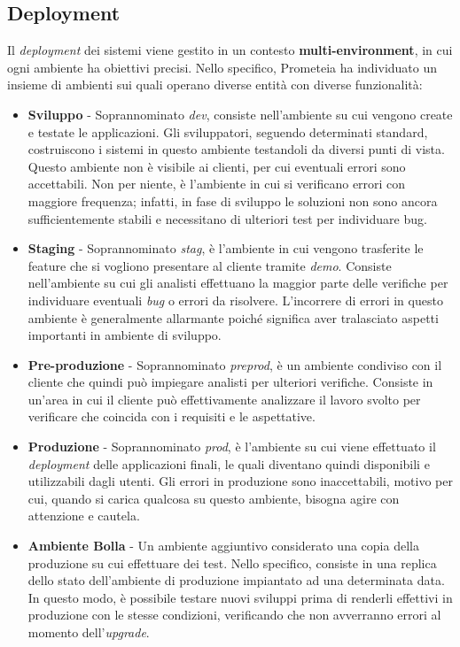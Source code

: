 \subsection{Deployment}\label{subsec:deployment}
Il \textit{deployment} dei sistemi viene gestito in un contesto \textbf{multi-environment}, in cui ogni ambiente ha obiettivi precisi.
Nello specifico, Prometeia ha individuato un insieme di ambienti sui quali operano diverse entità con diverse funzionalità:
\begin{itemize}
    \item \textbf{Sviluppo} - Soprannominato \textit{dev}, consiste nell'ambiente su cui vengono create e testate le applicazioni.
    Gli sviluppatori, seguendo determinati standard, costruiscono i sistemi in questo ambiente testandoli da diversi punti di vista.
    Questo ambiente non è visibile ai clienti, per cui eventuali errori sono accettabili.
    Non per niente, è l'ambiente in cui si verificano errori con maggiore frequenza;
    infatti, in fase di sviluppo le soluzioni non sono ancora sufficientemente stabili e necessitano di ulteriori test per individuare bug.
    \item \textbf{Staging} - Soprannominato \textit{stag}, è l'ambiente in cui vengono trasferite le feature che si vogliono presentare al cliente tramite \textit{demo}.
    Consiste nell'ambiente su cui gli analisti effettuano la maggior parte delle verifiche per individuare eventuali \textit{bug} o errori da risolvere.
    L'incorrere di errori in questo ambiente è generalmente allarmante poiché significa aver tralasciato aspetti importanti in ambiente di sviluppo.
    \item \textbf{Pre-produzione} - Soprannominato \textit{preprod}, è un ambiente condiviso con il cliente che quindi può impiegare analisti per ulteriori verifiche.
    Consiste in un'area in cui il cliente può effettivamente analizzare il lavoro svolto per verificare che coincida con i requisiti e le aspettative.
    \item \textbf{Produzione} - Soprannominato \textit{prod}, è l'ambiente su cui viene effettuato il \textit{deployment} delle applicazioni finali, le quali diventano quindi disponibili e utilizzabili dagli utenti.
    Gli errori in produzione sono inaccettabili, motivo per cui, quando si carica qualcosa su questo ambiente, bisogna agire con attenzione e cautela.
    \item \textbf{Ambiente Bolla} - Un ambiente aggiuntivo considerato una copia della produzione su cui effettuare dei test.
    Nello specifico, consiste in una replica dello stato dell'ambiente di produzione impiantato ad una determinata data.
    In questo modo, è possibile testare nuovi sviluppi prima di renderli effettivi in produzione con le stesse condizioni, verificando che non avverranno errori al momento dell'\textit{upgrade}.
\end{itemize}
